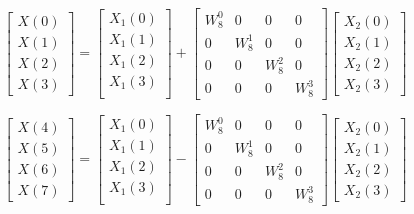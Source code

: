 \documentclass[journal,12pt,twocolumn]{IEEEtran}
\renewcommand\thesection{\arabic{section}}
\begin{document}
\begin{enumerate}[label=\arabic*.,ref=\thesection.\theenumi]
\begin{equation}
\begin{bmatrix}
X(0) \\ 
X(1) \\ 
X(2) \\ 
X(3)
\end{bmatrix}
=
\begin{bmatrix}
X_{1}(0) \\ 
X_{1}(1)\\ 
X_{1}(2)\\
X_{1}(3)\\
\end{bmatrix}
+
\begin{bmatrix}
W^{0}_{8} & 0 & 0 & 0\\
0 & W^{1}_{8} & 0 & 0\\
0 & 0 & W^{2}_{8} & 0\\
0 & 0 & 0 & W^{3}_{8}
\end{bmatrix}
\begin{bmatrix}
X_{2}(0) \\ 
X_{2}(1) \\ 
X_{2}(2) \\
X_{2}(3)
\end{bmatrix}
\end{equation}

\begin{equation}
\begin{bmatrix}
X(4) \\ 
X(5) \\ 
X(6) \\ 
X(7)
\end{bmatrix}
=
\begin{bmatrix}
X_{1}(0) \\ 
X_{1}(1)\\ 
X_{1}(2)\\
X_{1}(3)\\
\end{bmatrix}
-
\begin{bmatrix}
W^{0}_{8} & 0 & 0 & 0\\
0 & W^{1}_{8} & 0 & 0\\
0 & 0 & W^{2}_{8} & 0\\
0 & 0 & 0 & W^{3}_{8}
\end{bmatrix}
\begin{bmatrix}
X_{2}(0) \\ 
X_{2}(1) \\ 
X_{2}(2) \\
X_{2}(3)
\end{bmatrix}
\end{equation}


\end{enumerate}
\end{document}
